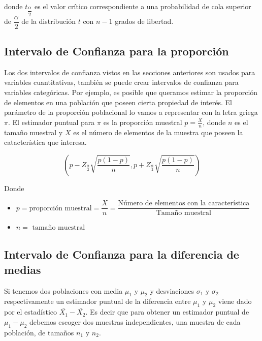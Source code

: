 \documentclass[letterpaper,]{book}
\begin{document}
donde \(t_{\dfrac{\alpha}{2}}\) es el valor crítico correspondiente a una probabilidad de cola superior de \(\dfrac{\alpha}{2}\) de la distribución \(t\) con \(n-1\) grados de libertad.

\hypertarget{intervalo-de-confianza-para-la-proporcion}{%
\subsection{Intervalo de Confianza para la proporción}\label{intervalo-de-confianza-para-la-proporcion}}

Los dos intervalos de confianza vistos en las secciones anteriores son usados para variables cuantitativas, también se puede crear intervalos de confianza para variables categóricas. Por ejemplo, es posible que queramos estimar la proporción de elementos en una población que poseen cierta propiedad de interés. El parámetro de la proporción poblacional lo vamos a representar con la letra griega \(\pi\). El estimador puntual para \(\pi\) es la proporción muestral \(p=\frac{X}{n}\), donde \(n\) es el tamaño muestral y \(X\) es el número de elementos de la muestra que poseen la catacterística que interesa.

\begin{equation} 
  \left(p - Z_{\frac{\alpha}{2}}\sqrt{\dfrac{p\left(1-p\right)}{n}}, p + Z_{\frac{\alpha}{2}}\sqrt{\dfrac{p\left(1-p\right)}{n}}  \right)
  \label{eq:icprop}
\end{equation}

Donde

\begin{itemize}
\item
  \(p=\text{proporción muestral}=\dfrac{X}{n} =\dfrac{\text{Número de elementos con la característica}}{\text{Tamaño muestral}}\)
\item
  \(n= \text{ tamaño muestral}\)
\end{itemize}

\hypertarget{intervalo-de-confianza-para-la-diferencia-de-medias}{%
\subsection{Intervalo de Confianza para la diferencia de medias}\label{intervalo-de-confianza-para-la-diferencia-de-medias}}

Si tenemos dos poblaciones con media \(\mu_1\) y \(\mu_2\) y desviaciones \(\sigma_1\) y \(\sigma_2\) respectivamente un estimador puntual de la diferencia entre \(\mu_1\) y \(\mu_2\) viene dado por el estadístico \(\bar{X_1}-\bar{X_2}\). Es decir que para obtener un estimador puntual de \(\mu_1-\mu_2\) debemos escoger dos muestras independientes, una muestra de cada población, de tamaños \(n_1\) y \(n_2\).
\end{document}
